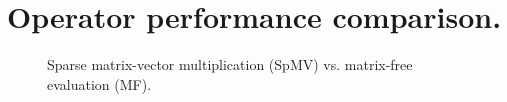 \documentclass[a4paper]{article}
\begin{document}
\section{Operator performance comparison.}

\begin{figure}[h]
    \begin{center}
        
    \end{center}
    \caption{Sparse matrix-vector multiplication (SpMV) vs. matrix-free evaluation (MF).}
\end{figure}
\end{document}
